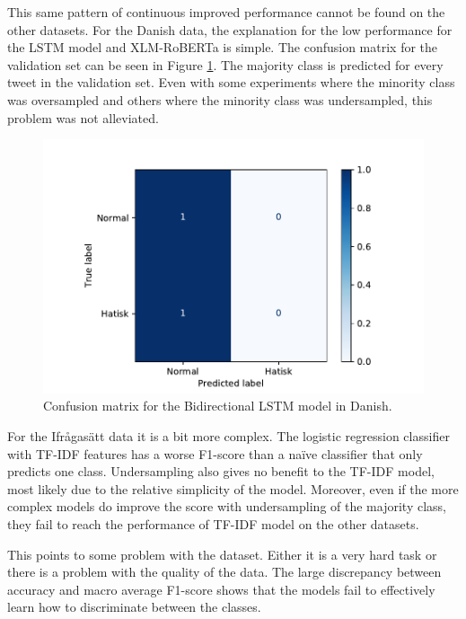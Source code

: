 \documentclass[nofilelist]{cslthse-msc}
\begin{document}
This same pattern of continuous improved performance cannot be found on the other datasets. For the Danish data, the explanation for the low performance for the LSTM model and XLM-RoBERTa is simple. The confusion matrix for the validation set can be seen in Figure \ref{fig:danlstm}. The majority class is predicted for every tweet in the validation set. Even with some experiments where the minority class was oversampled and others where the minority class was undersampled, this problem was not alleviated.


\begin{figure}[t]
    \centering
    \includegraphics[width=\textwidth*3/4]{bilstmcharsDanish.pdf}
    \caption{Confusion matrix for the Bidirectional LSTM model in Danish.}
    \label{fig:danlstm}
\end{figure}

For the Ifrågasätt data it is a bit more complex. The logistic regression classifier with TF-IDF features has a worse F1-score than a naïve classifier that only predicts one class. Undersampling also gives no benefit to the TF-IDF model, most likely due to the relative simplicity of the model. Moreover, even if the more complex models do improve the score with undersampling of the majority class, they fail to reach the performance of TF-IDF model on the other datasets. 

This points to some problem with the dataset. Either it is a very hard task or there is a problem with the quality of the data. The large discrepancy between  accuracy and macro average F1-score shows that the models fail to effectively learn how to discriminate between the classes.
\end{document}
